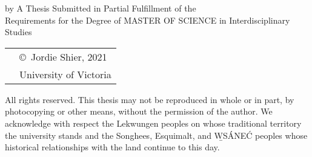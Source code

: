 \pagebreak
{
\centering
\thesistitle
\tpbreak
by
\tpbreak
\nameanddegrees
\tpbreak
A Thesis Submitted in Partial Fulfillment of the \\
Requirements for the Degree of
\tpbreak
MASTER OF SCIENCE
\tpbreak
in Interdisciplinary Studies\\
\vfill
\begin{tabular}{cl}
& \copyright\ Jordie Shier, 2021\\
& \phantom{\copyright} University of Victoria
\end{tabular}
\tpbreak
All rights reserved. This thesis may not be reproduced in whole or in part, by photocopying or other means, without the permission of the author.
\tpbreak
We acknowledge with respect the Lekwungen peoples on whose traditional territory the university stands and the Songhees, Esquimalt, and \b{W}S\'{A}NE\'{C} peoples whose historical relationships with the land continue to this day.\\
}
\pagebreak
